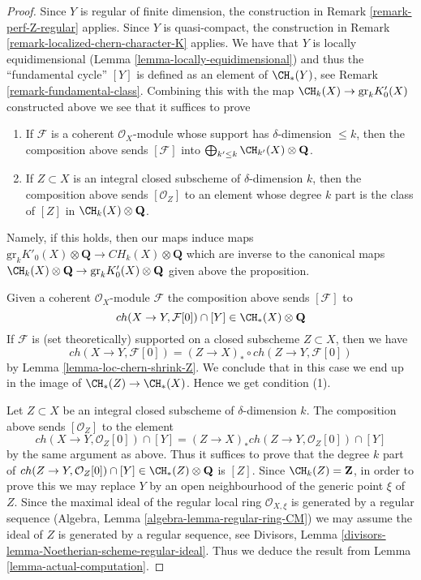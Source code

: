 \begin{proof}
Since $Y$ is regular of finite dimension, the construction in
Remark \ref{remark-perf-Z-regular} applies.
Since $Y$ is quasi-compact, the construction in
Remark \ref{remark-localized-chern-character-K} applies.
We have that $Y$ is locally equidimensional
(Lemma \ref{lemma-locally-equidimensional}) and
thus the ``fundamental cycle'' $[Y]$ is defined
as an element of $\CH_*(Y)$, see Remark \ref{remark-fundamental-class}.
Combining this with the map $\CH_k(X) \to \text{gr}_kK'_0(X)$
constructed above we see that it suffices to prove
\begin{enumerate}
\item If $\mathcal{F}$ is a coherent $\mathcal{O}_X$-module
whose support has $\delta$-dimension $\leq k$, then
the composition above sends $[\mathcal{F}]$ into
$\bigoplus_{k' \leq k} \CH_{k'}(X) \otimes \mathbf{Q}$.
\item If $Z \subset X$ is an integral closed subscheme
of $\delta$-dimension $k$, then the composition above
sends $[\mathcal{O}_Z]$ to an element whose degree $k$
part is the class of $[Z]$ in $\CH_k(X) \otimes \mathbf{Q}$.
\end{enumerate}
Namely, if this holds, then our maps induce maps
$\text{gr}_kK'_0(X) \otimes \mathbf{Q} \to CH_k(X) \otimes \mathbf{Q}$
which are inverse to the canonical maps 
$\CH_k(X) \otimes \mathbf{Q} \to \text{gr}_k K'_0(X) \otimes \mathbf{Q}$
given above the proposition.

\medskip\noindent
Given a coherent $\mathcal{O}_X$-module $\mathcal{F}$
the composition above sends $[\mathcal{F}]$ to
$$
ch(X \to Y, \mathcal{F}[0]) \cap [Y] \in \CH_*(X) \otimes \mathbf{Q}
$$
If $\mathcal{F}$ is (set theoretically) supported on a closed subscheme
$Z \subset X$, then we have
$$
ch(X \to Y, \mathcal{F}[0]) = (Z \to X)_* \circ ch(Z \to Y, \mathcal{F}[0])
$$
by Lemma \ref{lemma-loc-chern-shrink-Z}. We conclude that in this
case we end up in the image of $\CH_*(Z) \to \CH_*(X)$. Hence
we get condition (1).

\medskip\noindent
Let $Z \subset X$ be an integral closed subscheme of $\delta$-dimension $k$.
The composition above sends $[\mathcal{O}_Z]$ to the element
$$
ch(X \to Y, \mathcal{O}_Z[0]) \cap [Y] =
(Z \to X)_* ch(Z \to Y, \mathcal{O}_Z[0]) \cap [Y]
$$
by the same argument as above.
Thus it suffices to prove that the degree $k$ part of
$ch(Z \to Y, \mathcal{O}_Z[0]) \cap [Y] \in
\CH_*(Z) \otimes \mathbf{Q}$ is $[Z]$.
Since $\CH_k(Z) = \mathbf{Z}$, in order
to prove this we may replace $Y$ by an open neighbourhood of the
generic point $\xi$ of $Z$. Since the maximal ideal of the regular
local ring $\mathcal{O}_{X, \xi}$ is generated by a
regular sequence (Algebra, Lemma \ref{algebra-lemma-regular-ring-CM})
we may assume the ideal of $Z$ is generated by a regular sequence, see
Divisors, Lemma \ref{divisors-lemma-Noetherian-scheme-regular-ideal}.
Thus we deduce the result from Lemma \ref{lemma-actual-computation}.
\end{proof}







